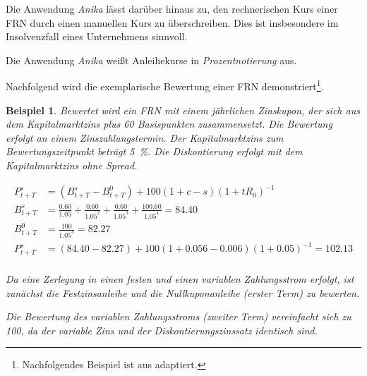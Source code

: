 \documentclass[12pt, a4paper]{article}
\theoremstyle{plain}
\newtheorem{example}{Beispiel}
\begin{document}
Die Anwendung \textit{Anika} lässt darüber hinaus zu, den rechnerischen Kurs einer \gls{FRN} durch einen manuellen Kurs zu überschreiben. Dies ist insbesondere im Insolvenzfall eines Unternehmens sinnvoll.

Die Anwendung \textit{Anika} weißt Anleihekurse in \textit{Prozentnotierung} aus.

Nachfolgend wird die exemplarische Bewertung einer \gls{FRN} demonstriert\footnote{Nachfolgendes Beispiel ist aus \textcite[][32]{alexander_market_2008} adaptiert.}. 

\begin{example}
	Bewertet wird ein \gls{FRN} mit einem jährlichen Zinskupon, der sich aus dem Kapitalmarktzins plus 60 Basispunkten zusammensetzt. Die Bewertung erfolgt an einem Zinszahlungstermin. Der Kapitalmarktzins zum Bewertungszeitpunkt beträgt 5~\%.
	Die Diskontierung erfolgt mit dem Kapitalmarktzins ohne Spread.

	\begin{align*}
		P_{t+T}^{s}&=\left(B_{t+T}^{s}-B_{t+T}^{0}\right)+100(1+c - s)\left(1+t R_{0}\right)^{-1}\\
		B_{t+T}^{s}&=\frac{0.60}{1.05}+\frac{0.60}{1.05^2}+\frac{0.60}{1.05^3}+\frac{100.60}{1.05^4}=84.40\\
		B_{t+T}^{0}&=\frac{100}{1.05^4}=82.27\\
		P_{t+T}^{s}&= (84.40-82.27) + 100(1+0.056 - 0.006) (1+0.05)^{-1} = 102.13\\
	\end{align*}

	Da eine Zerlegung in einen festen und einen variablen Zahlungsstrom erfolgt, ist zunächst die Festzinsanleihe und die Nullkuponanleihe (erster Term) zu bewerten.

	Die Bewertung des variablen Zahlungsstroms (zweiter Term) vereinfacht sich zu 100, da der variable Zins und der Diskontierungszinssatz identisch sind.
\end{example}



 
\end{document}
